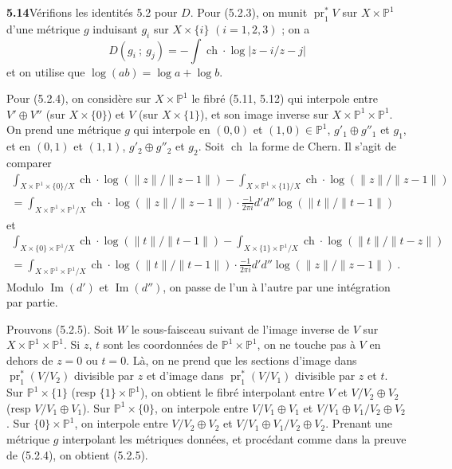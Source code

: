 \documentclass[12pt,a4paper]{article}
\theoremstyle{plain}
\theoremstyle{definition}
\theoremstyle{remark}
\DeclareMathOperator{\ch}{ch}
\DeclareMathOperator{\Imagem}{Im}
\newcommand{\bbP}{\mathbb{P}}
\DeclareMathOperator{\pr}{pr}
\begin{document}
\medskip
\noindent\textbf{5.14}\quad V\'erifions les identit\'es 5.2 pour $D$. Pour (5.2.3), on munit $\pr_1^*V$ sur $X \times \bbP^1$ d'une m\'etrique $g$ induisant $g_i$ sur $X \times \{i\}$ $(i = 1,2,3)$ ; on a
\[
D(g_i \ ; \ g_j) = -\int \ch \cdot \log|z-i/z-j|
\]
et on utilise que $\log(ab) = \log a + \log b$.

Pour (5.2.4), on consid\`ere sur $X \times \bbP^1$ le fibr\'e (5.11, 5.12) qui interpole entre $V' \oplus V''$ (sur $X \times \{0\}$) et $V$ (sur $X \times \{1\}$), et son image inverse sur $X \times \bbP^1 \times \bbP^1$. On prend une m\'etrique $g$ qui interpole en $(0,0)$ et $(1,0) \in \bbP^1$, $g'_1 \oplus g''_1$ et $g_1$, et en $(0,1)$ et $(1,1)$, $g'_2 \oplus g''_2$ et $g_2$. Soit $\ch$ la forme de Chern. Il s'agit de comparer
\begin{multline*}
\int_{X \times \bbP^1 \times \{0\}/X} \ch \cdot \log(\|z\|/\|z-1\|) - \int_{X \times \bbP^1 \times \{1\}/X} \ch \cdot \log(\|z\|/\|z-1\|) \\
= \int_{X \times \bbP^1 \times \bbP^1/X} \ch \cdot \log(\|z\|/\|z-1\|) \cdot \frac{-1}{2\pi i} d'd'' \log(\|t\|/\|t-1\|)
\end{multline*}
et
\begin{multline*}
\int_{X \times \{0\} \times \bbP^1/X} \ch \cdot \log(\|t\|/\|t-1\|) - \int_{X \times \{1\} \times \bbP^1/X} \ch \cdot \log(\|t\|/\|t-z\|) \\
= \int_{X \times \bbP^1 \times \bbP^1/X} \ch \cdot \log(\|t\|/\|t-1\|) \cdot \frac{-1}{2\pi i} d'd'' \log(\|z\|/\|z-1\|) \ .
\end{multline*}
Modulo $\Imagem(d')$ et $\Imagem(d'')$, on passe de l'un \`a l'autre par une int\'egration par partie.

Prouvons (5.2.5). Soit $W$ le sous-faisceau suivant de l'image inverse de $V$ sur $X \times \bbP^1 \times \bbP^1$. Si $z$, $t$ sont les coordonn\'ees de $\bbP^1 \times \bbP^1$, on ne touche pas \`a $V$ en dehors de $z=0$ ou $t=0$. L\`a, on ne prend que les sections d'image dans $\pr_1^*(V/V_2)$ divisible par $z$ et d'image dans $\pr_1^*(V/V_1)$ divisible par $z$ et $t$. Sur $\bbP^1 \times \{1\}$ (resp $\{1\} \times \bbP^1$), on obtient le fibr\'e interpolant entre $V$ et $V/V_2 \oplus V_2$ (resp $V/V_1 \oplus V_1$). Sur $\bbP^1 \times \{0\}$, on interpole entre $V/V_1 \oplus V_1$ et $V/V_1 \oplus V_1/V_2 \oplus V_2$. Sur $\{0\} \times \bbP^1$, on interpole entre $V/V_2 \oplus V_2$ et $V/V_1 \oplus V_1/V_2 \oplus V_2$. Prenant une m\'etrique $g$ interpolant les m\'etriques donn\'ees, et proc\'edant comme dans la preuve de (5.2.4), on obtient (5.2.5).
\end{document}
